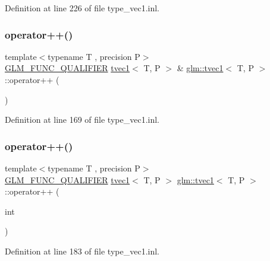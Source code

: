 Definition at line 226 of file type\+\_\+vec1.\+inl.

\mbox{\label{structglm_1_1tvec1_a073c75830716722cd4ffcb516788cec5}} 
\subsubsection{\texorpdfstring{operator++()}{operator++()}\hspace{0.1cm}{\footnotesize\ttfamily [1/2]}}
{\footnotesize\ttfamily template$<$typename T , precision P$>$ \\
\mbox{\hyperlink{setup_8hpp_a33fdea6f91c5f834105f7415e2a64407}{G\+L\+M\+\_\+\+F\+U\+N\+C\+\_\+\+Q\+U\+A\+L\+I\+F\+I\+ER}} \mbox{\hyperlink{structglm_1_1tvec1}{tvec1}}$<$ T, P $>$ \& \mbox{\hyperlink{structglm_1_1tvec1}{glm\+::tvec1}}$<$ T, P $>$\+::operator++ (\begin{DoxyParamCaption}{ }\end{DoxyParamCaption})}



Definition at line 169 of file type\+\_\+vec1.\+inl.

\mbox{\label{structglm_1_1tvec1_a4dbefeaefe398e52093be02b638047cd}} 
\subsubsection{\texorpdfstring{operator++()}{operator++()}\hspace{0.1cm}{\footnotesize\ttfamily [2/2]}}
{\footnotesize\ttfamily template$<$typename T , precision P$>$ \\
\mbox{\hyperlink{setup_8hpp_a33fdea6f91c5f834105f7415e2a64407}{G\+L\+M\+\_\+\+F\+U\+N\+C\+\_\+\+Q\+U\+A\+L\+I\+F\+I\+ER}} \mbox{\hyperlink{structglm_1_1tvec1}{tvec1}}$<$ T, P $>$ \mbox{\hyperlink{structglm_1_1tvec1}{glm\+::tvec1}}$<$ T, P $>$\+::operator++ (\begin{DoxyParamCaption}\item[{int}]{ }\end{DoxyParamCaption})}



Definition at line 183 of file type\+\_\+vec1.\+inl.

